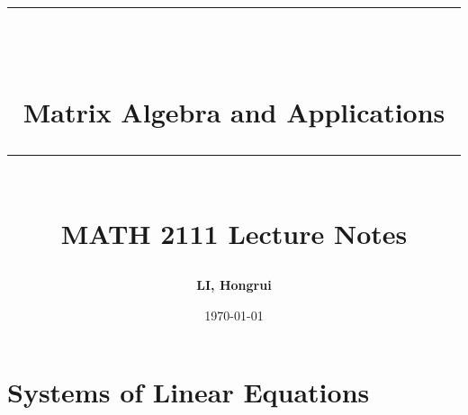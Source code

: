 \documentclass[10pt, a4paper]{article}
\newcommand{\HRule}[1]{\rule{\linewidth}{#1}}
\begin{document}
\title{ \normalsize \textsc{}
\\ [2.0cm]
\HRule{1.5pt} \\ [0.3cm]
\LARGE {\textbf{Matrix Algebra and Applications}
\HRule{1.5pt} \\ [0.6cm]
\LARGE{\textbf{MATH 2111 Lecture Notes}} \vspace*{10\baselineskip}}
}
\date{\today}
\author{\textbf{LI, Hongrui}}  %
\maketitle

\clearpage
\tableofcontents
\newpage


\section{Systems of Linear Equations}
\end{document}
